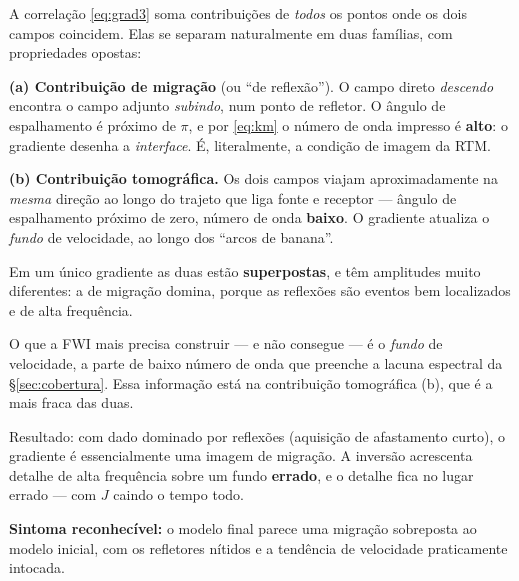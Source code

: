 \documentclass[11pt,a4paper,oneside]{report}
\begin{document}
\begin{teoria}
A correla\c{c}\~ao \eqref{eq:grad3} soma contribui\c{c}\~oes de \emph{todos} os
pontos onde os dois campos coincidem. Elas se separam naturalmente em duas
fam\'ilias, com propriedades opostas:

\textbf{(a) Contribui\c{c}\~ao de migra\c{c}\~ao} (ou ``de reflex\~ao''). O
campo direto \emph{descendo} encontra o campo adjunto \emph{subindo}, num
ponto de refletor. O \^angulo de espalhamento \'e pr\'oximo de $\pi$, e por
\eqref{eq:km} o n\'umero de onda impresso \'e \textbf{alto}: o gradiente
desenha a \emph{interface}. \'E, literalmente, a condi\c{c}\~ao de imagem da
RTM.

\textbf{(b) Contribui\c{c}\~ao tomogr\'afica.} Os dois campos viajam
aproximadamente na \emph{mesma} dire\c{c}\~ao ao longo do trajeto que liga
fonte e receptor --- \^angulo de espalhamento pr\'oximo de zero, n\'umero de
onda \textbf{baixo}. O gradiente atualiza o \emph{fundo} de velocidade, ao
longo dos ``arcos de banana''.

Em um \'unico gradiente as duas est\~ao \textbf{superpostas}, e t\^em
amplitudes muito diferentes: a de migra\c{c}\~ao domina, porque as
reflex\~oes s\~ao eventos bem localizados e de alta frequ\^encia.
\end{teoria}

\begin{armadilha}
O que a FWI mais precisa construir --- e n\~ao consegue --- \'e o
\emph{fundo} de velocidade, a parte de baixo n\'umero de onda que preenche a
lacuna espectral da §\ref{sec:cobertura}. Essa informa\c{c}\~ao est\'a na
contribui\c{c}\~ao tomogr\'afica (b), que \'e a mais fraca das duas.

Resultado: com dado dominado por reflex\~oes (aquisi\c{c}\~ao de afastamento
curto), o gradiente \'e essencialmente uma imagem de migra\c{c}\~ao. A
invers\~ao acrescenta detalhe de alta frequ\^encia sobre um fundo
\textbf{errado}, e o detalhe fica no lugar errado --- com $J$ caindo o tempo
todo.

\textbf{Sintoma reconhec\'ivel:} o modelo final parece uma migra\c{c}\~ao
sobreposta ao modelo inicial, com os refletores n\'itidos e a tend\^encia de
velocidade praticamente intocada.
\end{armadilha}
\end{document}
